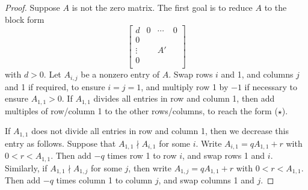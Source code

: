 \documentclass[12pt,a4paper]{article}
\theoremstyle{definition}
\begin{document}
\begin{proof}
  Suppose $A$ is not the zero matrix. The first goal is to reduce $A$ to the block form
  \[ \left[
    \begin{array}{c|ccc}
      d & 0 & \cdots & 0 \\
      \hline
      0 & & & \\
      \vdots & & A' & \\
      0 & & & \\
    \end{array}\right] \tag{$\star$}
  \]
  with $d>0$. Let $A_{i,j}$ be a nonzero entry of $A$. Swap rows $i$ and 1, and columns $j$ and 1 if required, to ensure $i=j=1$, and multiply row 1 by $-1$ if necessary to ensure $A_{1,1}>0$. If $A_{1,1}$ divides all entries in row and column 1, then add multiples of row/column 1 to the other rows/columns, to reach the form ($\star$).

  If $A_{1,1}$ does not divide all entries in row and column 1, then we decrease this entry as follows. Suppose that $A_{1,1}\nmid A_{i,1}$ for some $i$. Write $A_{i,1}=qA_{1,1}+r$ with $0<r<A_{1,1}$. Then add $-q$ times row 1 to row $i$, and swap rows 1 and $i$. Similarly, if $A_{1,1}\nmid A_{1,j}$ for some $j$, then write $A_{1,j}=qA_{1,1}+r$ with $0<r<A_{1,1}$. Then add $-q$ times column 1 to column $j$, and swap columns 1 and $j$.


\end{proof}
\end{document}
